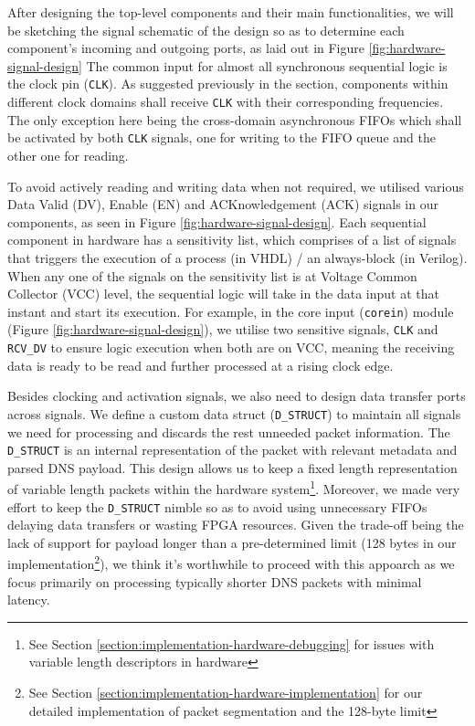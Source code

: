\documentclass[a4paper]{report}
\newcommand{\code}{\texttt}
\begin{document}
After designing the top-level components and their main functionalities, we will be sketching the signal schematic of the design so as to determine each component's incoming and outgoing ports, as laid out in Figure \ref{fig:hardware-signal-design} The common input for almost all synchronous sequential logic is the clock pin (\code{CLK}). As suggested previously in the section, components within different clock domains shall receive \code{CLK} with their corresponding frequencies. The only exception here being the cross-domain asynchronous FIFOs which shall be activated by both \code{CLK} signals, one for writing to the FIFO queue and the other one for reading.

To avoid actively reading and writing data when not required, we utilised various Data Valid (DV), Enable (EN) and ACKnowledgement (ACK) signals in our components, as seen in Figure \ref{fig:hardware-signal-design}. Each sequential component in hardware has a sensitivity list, which comprises of a list of signals that triggers the execution of a process (in VHDL) / an always-block (in Verilog). When any one of the signals on the sensitivity list is at Voltage Common Collector (VCC) level, the sequential logic will take in the data input at that instant and start its execution. For example, in the core input (\code{corein}) module (Figure \ref{fig:hardware-signal-design}), we utilise two sensitive signals, \code{CLK} and \code{RCV\_DV} to ensure logic execution when both are on VCC, meaning the receiving data is ready to be read and further processed at a rising clock edge.

Besides clocking and activation signals, we also need to design data transfer ports across signals. We define a custom data struct (\code{D\_STRUCT}) to maintain all signals we need for processing and discards the rest unneeded packet information. The \code{D\_STRUCT} is an internal representation of the packet with relevant metadata and parsed DNS payload. This design allows us to keep a fixed length representation of variable length packets within the hardware system\footnote{See Section \ref{section:implementation-hardware-debugging} for issues with variable length descriptors in hardware}. Moreover, we made very effort to keep the \code{D\_STRUCT} nimble so as to avoid using unnecessary FIFOs delaying data transfers or wasting FPGA resources. Given the trade-off being the lack of support for payload longer than a pre-determined limit (128 bytes in our implementation\footnote{See Section \ref{section:implementation-hardware-implementation} for our detailed implementation of packet segmentation and the 128-byte limit}), we think it's worthwhile to proceed with this appoarch as we focus primarily on processing typically shorter DNS packets with minimal latency.
\end{document}
